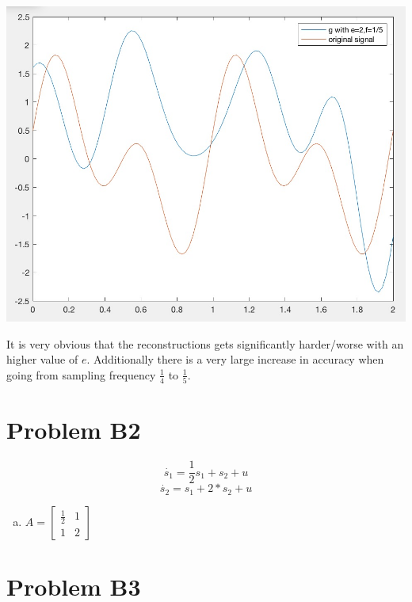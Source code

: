 \documentclass[12pt]{article}
\begin{document}
\begin{enumerate}[a)]
\begin{centering}
        \includegraphics[scale = 0.3]{figures/e20-f15}\\
        \end{centering}

        It is very obvious that the reconstructions gets significantly harder/worse with an higher value of $e$. Additionally there is a very large increase in accuracy when going from sampling frequency $\frac{1}{4}$ to $\frac{1}{5}$.


\end{enumerate}

\newpage
\section*{Problem B2}

$$\dot{s_1} = \frac{1}{2} s_1 + s_2 + u$$
$$\dot{s_2} = s_1 + 2 * s_2 + u$$

\begin{enumerate}[a)]
    \item 
        $A = \begin{bmatrix}
            \frac{1}{2} & 1\\
            1 & 2
        \end{bmatrix}$


\end{enumerate}

\section*{Problem B3}
\end{document}
